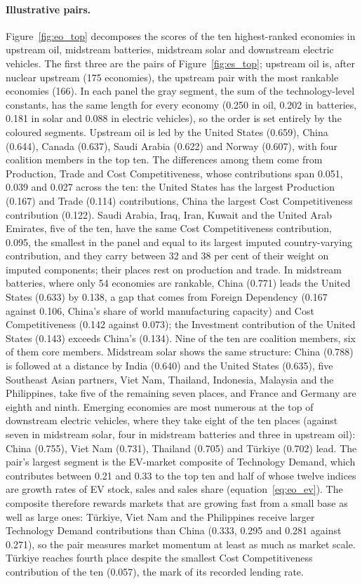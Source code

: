 \paragraph{Illustrative pairs.} Figure~\ref{fig:eo_top} decomposes the scores of the ten
highest-ranked economies in upstream oil, midstream batteries, midstream solar and downstream
electric vehicles. The first three are the pairs of Figure~\ref{fig:es_top}; upstream oil is,
after nuclear upstream (175 economies), the upstream pair with the most rankable economies (166).
In each panel the gray segment, the sum of the technology-level constants, has the same length for
every economy (0.250 in oil, 0.202 in batteries, 0.181 in solar and 0.088 in electric vehicles),
so the order is set entirely by the coloured segments. Upstream oil is led by the United States
(0.659), China (0.644), Canada (0.637), Saudi Arabia (0.622) and Norway (0.607), with four
coalition members in the top ten. The differences among them come from Production, Trade and Cost
Competitiveness, whose contributions span 0.051, 0.039 and 0.027 across the ten: the United States
has the largest Production (0.167) and Trade (0.114) contributions, China the largest Cost
Competitiveness contribution (0.122). Saudi Arabia, Iraq, Iran, Kuwait and the United Arab
Emirates, five of the ten, have the same Cost Competitiveness contribution, 0.095, the smallest in
the panel and equal to its largest imputed country-varying contribution, and they carry between 32
and 38 per cent of their weight on imputed components; their places rest on production and trade.
In midstream batteries, where only 54 economies are rankable, China (0.771) leads the United States
(0.633) by 0.138, a gap that comes from Foreign Dependency (0.167 against 0.106, China's share of
world manufacturing capacity) and Cost Competitiveness (0.142 against 0.073); the Investment
contribution of the United States (0.143) exceeds China's (0.134). Nine of the ten are coalition
members, six of them core members. Midstream solar shows the same structure: China (0.788) is
followed at a distance by India (0.640) and the United States (0.635), five Southeast Asian
partners, Viet Nam, Thailand, Indonesia, Malaysia and the Philippines, take five of the remaining
seven places, and France and Germany are eighth and ninth. Emerging economies are most numerous at
the top of downstream electric vehicles, where they take eight of the ten places (against seven in
midstream solar, four in midstream batteries and three in upstream oil): China (0.755), Viet Nam
(0.731), Thailand (0.705) and T\"urkiye (0.702) lead. The pair's largest segment is the EV-market
composite of Technology Demand, which contributes between 0.21 and 0.33 to the top ten and half of
whose twelve indices are growth rates of EV stock, sales and sales share
(equation~\eqref{eq:eo_ev}). The composite therefore rewards markets that are growing fast from a
small base as well as large ones: T\"urkiye, Viet Nam and the Philippines receive larger Technology
Demand contributions than China (0.333, 0.295 and 0.281 against 0.271), so the pair measures market
momentum at least as much as market scale. T\"urkiye reaches fourth place despite the smallest Cost
Competitiveness contribution of the ten (0.057), the mark of its recorded lending rate.

